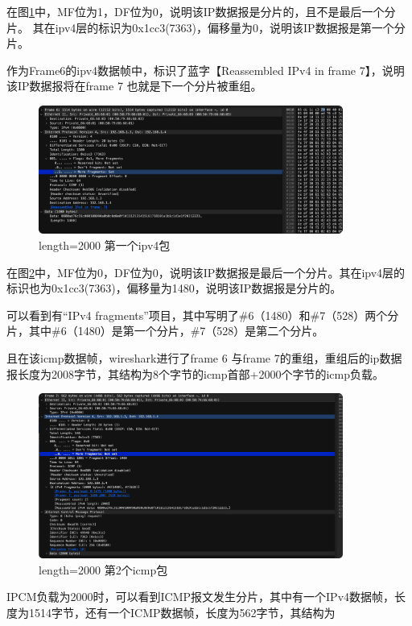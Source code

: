 \documentclass[a4paper,12pt]{report}
\begin{document}
\begin{spacing}{1.5}
在图\ref{pic:2000_ipv4}中，MF位为1，DF位为0，说明该IP数据报是分片的，且不是最后一个分片。
其在ipv4层的标识为0x1cc3(7363)，偏移量为0，说明该IP数据报是第一个分片。

作为Frame6的ipv4数据帧中，标识了蓝字【Reassembled IPv4 in frame 7】，说明该IP数据报将在frame 7 也就是下一个分片被重组。

\begin{figure}[htb!]
  \centering
\includegraphics[width=10cm]{figure/2000_ipv4.png}
\caption{length=2000 第一个ipv4包}
\label{pic:2000_ipv4}
\end{figure}

在图\ref{pic:2000_icmp}中，MF位为0，DF位为0，说明该IP数据报是最后一个分片。其在ipv4层的标识也为0x1cc3(7363)，偏移量为1480，说明该IP数据报是分片的。

可以看到有“IPv4 fragments”项目，其中写明了\#6（1480）和\#7（528）两个分片，其中\#6（1480）是第一个分片，\#7（528）是第二个分片。

且在该icmp数据帧，wireshark进行了frame 6 与frame 7的重组，重组后的ip数据报长度为2008字节，其结构为8个字节的icmp首部+2000个字节的icmp负载。



\begin{figure}[htb!]
  \centering
\includegraphics[width=10cm]{figure/2000_icmp.png}
\caption{length=2000 第2个icmp包}
\label{pic:2000_icmp}
\end{figure}


IPCM负载为2000时，可以看到ICMP报文发生分片，其中有一个IPv4数据帧，长度为1514字节，还有一个ICMP数据帧，长度为562字节，其结构为


\end{spacing}
\end{document}
